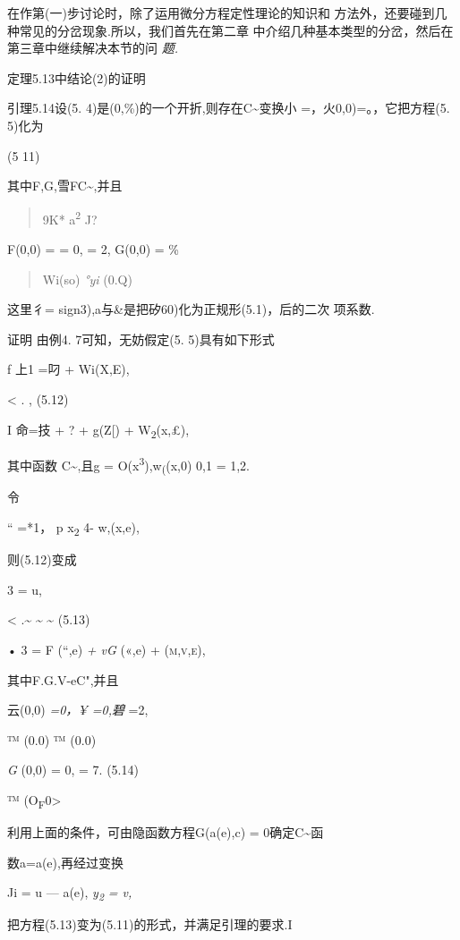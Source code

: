 \documentclass{article}
\begin{document}
在作第(一)步讨论时，除了运用微分方程定性理论的知识和
方法外，还要碰到几种常见的分岔现象.所以，我们首先在第二章
中介绍几种基本类型的分岔，然后在第三章中继续解决本节的问 \emph{题.}

定理5.13中结论(2)的证明

引理5.14设(5. 4)是(0,\%)的一个开折,则存在C\textasciitilde{}变换小
=，火0,0)=。，它把方程(5. 5)化为

(5 11)

其中F,G,雪FC\textasciitilde{},并且

\begin{quote}
9K* a\textsuperscript{2} J?
\end{quote}

F(0,0) = = 0, = 2, G(0,0) = \%

\begin{quote}
Wi(so) \emph{°yi} (0.Q)
\end{quote}

这里彳= sign3),a与\&是把矽60)化为正规形(5.1)，后的二次 项系数.

证明 由例4. 7可知，无妨假定(5. 5)具有如下形式

f 上1 =叼 + Wi(X,E),

\textless{} . , (5.12)

I 命=技 + ? + g(Z{[}) + W\textsubscript{2}(x,£),

其中函数 C\textasciitilde{},且g =
O(\textbar{}x\textbar{}\textsuperscript{3}),w\textsubscript{(}(x,0) 0,1
= 1,2.

令

`` =*1， p x\textsubscript{2} 4- w,(x,e),

则(5.12)变成

3 = u,

\textless{} .\textasciitilde{} \textasciitilde{} \textasciitilde{}
(5.13)

• 3 = F (``,e) \emph{+ vG} («,e) + \textsc{(m,v,e),}

其中F.G.V-eC",并且

云(0,0) \emph{=0，¥ =0,碧} =2,

™ (0.0) ™ (0.0)

\emph{G} (0,0) = 0, = 7. (5.14)

™ (O\textsubscript{F}0\textgreater{}

利用上面的条件，可由隐函数方程G(a(e),c) = 0确定C\textasciitilde{}函

数a=a(e),再经过变换

Ji = u --- a(e), \emph{y\textsubscript{2} = v,}

把方程(5.13)变为(5.11)的形式，并满足引理的要求.I
\end{document}
